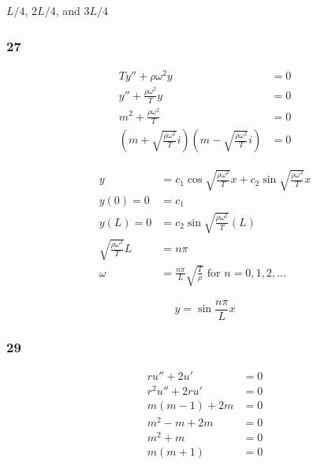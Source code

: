 \documentclass{article}
\begin{document}
$L / 4$, $2 L / 4$, and $3 L / 4$

\subsubsection{27}

\begin{align*}
  T y'' + \rho \omega^2 y                                                                               & = 0 \\
  y'' + \frac{\rho \omega^2}{T} y                                                                       & = 0 \\
  m^2 + \frac{\rho \omega^2}{T}                                                                         & = 0 \\
  \left(m + \sqrt{\frac{\rho \omega^2}{T}} i \right) \left(m - \sqrt{\frac{\rho \omega^2}{T}} i \right) & = 0
\end{align*}

\begin{align*}
  y                                & = c_1 \cos \sqrt{\frac{\rho \omega^2}{T}} x + c_2 \sin \sqrt{\frac{\rho \omega^2}{T}} x \\
  y(0) = 0                         & = c_1                                                                                   \\
  y(L) = 0                         & = c_2 \sin \sqrt{\frac{\rho \omega^2}{T}} (L)                                           \\
  \sqrt{\frac{\rho \omega^2}{T}} L & = n \pi                                                                                 \\
  \omega                           & = \frac{n \pi}{L} \sqrt{\frac{T}{\rho}} \text{ for } n = 0, 1, 2, \ldots
\end{align*}

\[y = \sin \frac{n \pi}{L} x\]

\subsubsection{29}

\begin{align*}
  r u'' + 2 u'     & = 0 \\
  r^2 u'' + 2 r u' & = 0 \\
  m (m - 1) + 2 m  & = 0 \\
  m^2 - m + 2 m    & = 0 \\
  m^2 + m          & = 0 \\
  m (m + 1)        & = 0
\end{align*}
\end{document}
